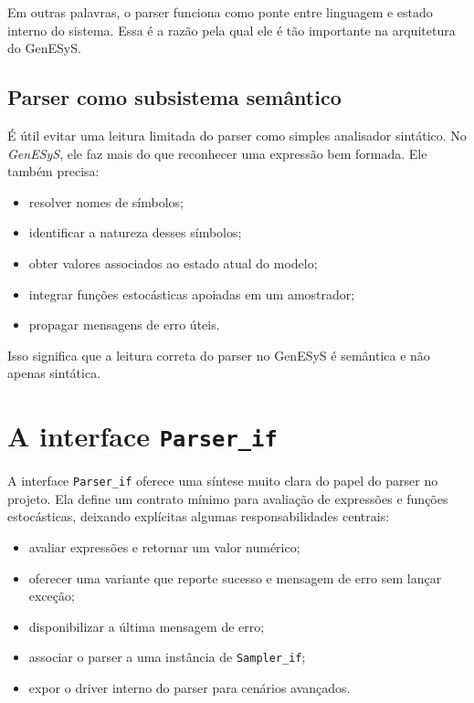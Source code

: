 Em outras palavras, o parser funciona como ponte entre linguagem e estado interno do sistema. Essa é a razão pela qual ele é tão importante na arquitetura do GenESyS.

\subsection{Parser como subsistema semântico}
\label{subsec:cap9_parser_como_subsistema_semantico}

É útil evitar uma leitura limitada do parser como simples analisador sintático. No \textit{GenESyS}, ele faz mais do que reconhecer uma expressão bem formada. Ele também precisa:
\begin{itemize}
    \item resolver nomes de símbolos;
    \item identificar a natureza desses símbolos;
    \item obter valores associados ao estado atual do modelo;
    \item integrar funções estocásticas apoiadas em um amostrador;
    \item propagar mensagens de erro úteis.
\end{itemize}

Isso significa que a leitura correta do parser no GenESyS é semântica e não apenas sintática.

\section{A interface \texttt{Parser\_if}}
\label{sec:cap9_interface_parser_if}

A interface \texttt{Parser\_if} oferece uma síntese muito clara do papel do parser no projeto. Ela define um contrato mínimo para avaliação de expressões e funções estocásticas, deixando explícitas algumas responsabilidades centrais:
\begin{itemize}
    \item avaliar expressões e retornar um valor numérico;
    \item oferecer uma variante que reporte sucesso e mensagem de erro sem lançar exceção;
    \item disponibilizar a última mensagem de erro;
    \item associar o parser a uma instância de \texttt{Sampler\_if};
    \item expor o driver interno do parser para cenários avançados.
\end{itemize}

